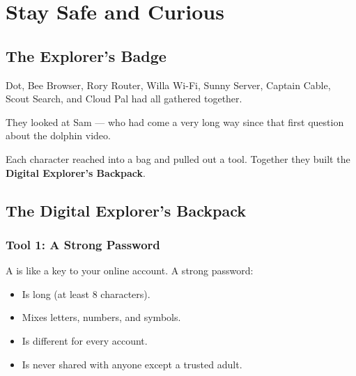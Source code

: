 
\chapter{Stay Safe and Curious}


\section*{The Explorer's Badge}

Dot, Bee Browser, Rory Router, Willa Wi-Fi, Sunny Server, Captain Cable,
Scout Search, and Cloud Pal had all gathered together.

They looked at Sam — who had come a very long way since that first question
about the dolphin video.


Each character reached into a bag and pulled out a tool.
Together they built the \textbf{Digital Explorer's Backpack}.

\sectionrule

\section*{The Digital Explorer's Backpack}

\subsection*{Tool 1: A Strong Password}

A  is like a key to your online account.
A strong password:
\begin{itemize}
  \item Is long (at least 8 characters).
  \item Mixes letters, numbers, and symbols.
  \item Is different for every account.
  \item Is never shared with anyone except a trusted adult.
\end{itemize}

